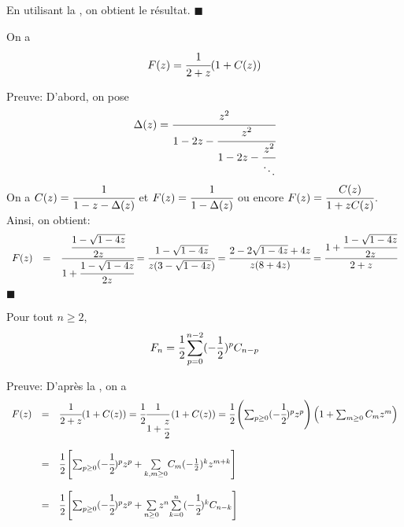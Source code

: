 En utilisant la , on obtient le résultat. \hspace{10pt}$\blacksquare$
\begin{proposition} \label{CatFinGenRelation}
	On a \[F(z)=\cfrac{1}{2+z}(1+C(z))\]
\end{proposition}
{Preuve}:
D'abord, on pose \[\Delta(z)=\cfrac{z^2}{1-2z-\cfrac{z^2}{1-2z-\cfrac{z^2}{\ddots}}}\]
On a $C(z)=\cfrac{1}{1-z-\Delta(z)}$ et $F(z)=\cfrac{1}{1-\Delta(z)} $ ou encore $F(z)=\cfrac{C(z)}{1+zC(z)} $. \vspace{5pt}\\
Ainsi, on obtient:
\[
	\begin{array} {c c l}
		F(z) & = & \cfrac{\cfrac{1-\sqrt{1-4z}}{2z}}{1+\cfrac{1-\sqrt{1-4z}}{2z}} =\cfrac{1-\sqrt{1-4z}}{z(3-\sqrt{1-4z})}=\cfrac{2-2\sqrt{1-4z}+4z}{z(8+4z)}=\cfrac{1+\cfrac{1-\sqrt{1-4z}}{2z}}{2+z}
	\end{array}
\]
$\blacksquare$
\begin{proposition}
	Pour tout $n\geq 2$,\[ F_{n}=\cfrac{1}{2}\sum_{p=0}^{n-2}(-\frac{1}{2})^p C_{n-p}\]
\end{proposition}
Preuve:
D'après la , on a\\
\[
	\begin{array}{c c l}
		F(z) & =        & \cfrac{1}{2+z}(1+C(z))=\cfrac{1}{2}\cfrac{1}{1+\cfrac{z}{2}}\left(1+C(z)\right)
		=\cfrac{1}{2}\left(\sum_{p\geq 0}(-\cfrac{1}{2})^p z^p\right)\left(1+\sum_{m\geq 0}C_{m}z^m\right)                                                                   \\
		     & \text{}  &                                                                                                                                                    \\
		     & =        & \cfrac{1}{2} \left[ \sum_{p\geq 0}(-\cfrac{1}{2})^p z^p + \underset{k,m\geq0}{\sum}C_{m}(-\frac{1}{2})^k
		z^{m+k}\right]                                                                                                                                                       \\
		     & \text{ } &                                                                                                                                                    \\
		     & =        & \cfrac{1}{2}\left[\sum_{p\geq 0}(-\cfrac{1}{2})^p z^p +\underset{n\geq0}{\sum}z^n\underset{k=0}{\overset{n}{\sum}}(-\cfrac{1}{2})^k C_{n-k}\right]
	\end{array}
\]
